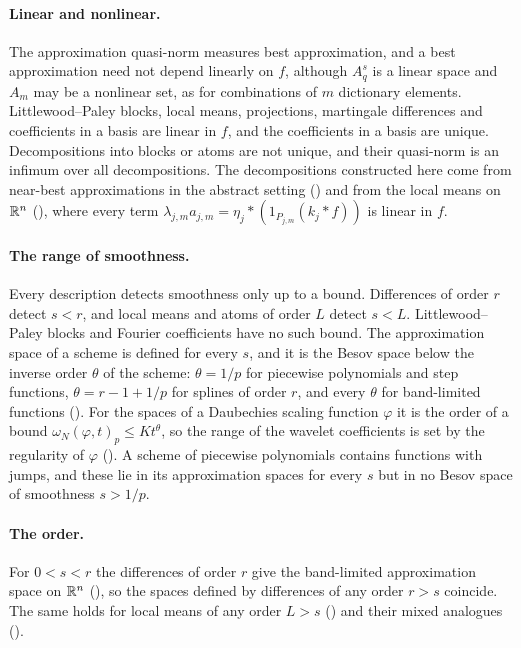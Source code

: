 \paragraph{Linear and nonlinear.} The approximation quasi-norm measures best approximation, and a
best approximation need not depend linearly on $f$, although $A^s_q$ is a linear space and $A_m$
may be a nonlinear set, as for combinations of $m$ dictionary elements. Littlewood--Paley blocks,
local means, projections, martingale differences and coefficients in a basis are linear in $f$,
and the coefficients in a basis are unique. Decompositions into blocks or atoms are not unique,
and their quasi-norm is an infimum over all decompositions. The decompositions constructed here
come from near-best approximations in the abstract setting () and from
the local means on $\mathbb{R}^n$ (), where every term
$\lambda_{j,m} a_{j,m} = \eta_j * (1_{P_{j,m}} (k_j * f))$ is linear in $f$.

\paragraph{The range of smoothness.} Every description detects smoothness only up to a bound.
Differences of order $r$ detect $s < r$, and local means and atoms of order $L$ detect $s < L$.
Littlewood--Paley blocks and Fourier coefficients have no such bound. The approximation space of a scheme is defined for every $s$, and it is the Besov
space below the inverse order $\theta$ of the scheme: $\theta = 1/p$ for piecewise polynomials and
step functions, $\theta = r - 1 + 1/p$ for splines of order $r$, and every $\theta$ for
band-limited functions (). For the spaces of a Daubechies scaling function
$\varphi$ it is the order of a bound $\omega_N(\varphi, t)_p \leq K t^\theta$, so the range of
the wavelet coefficients is set by the regularity of $\varphi$ (). A scheme
of piecewise polynomials contains
functions with jumps, and these lie in its approximation spaces for every $s$ but in no Besov
space of smoothness $s > 1/p$.

\paragraph{The order.} For $0 < s < r$ the differences of order $r$ give the band-limited
approximation space on $\mathbb{R}^n$ (), so the spaces defined by differences of any
order $r > s$ coincide. The same holds for local means of any order $L > s$
() and their mixed analogues ().

